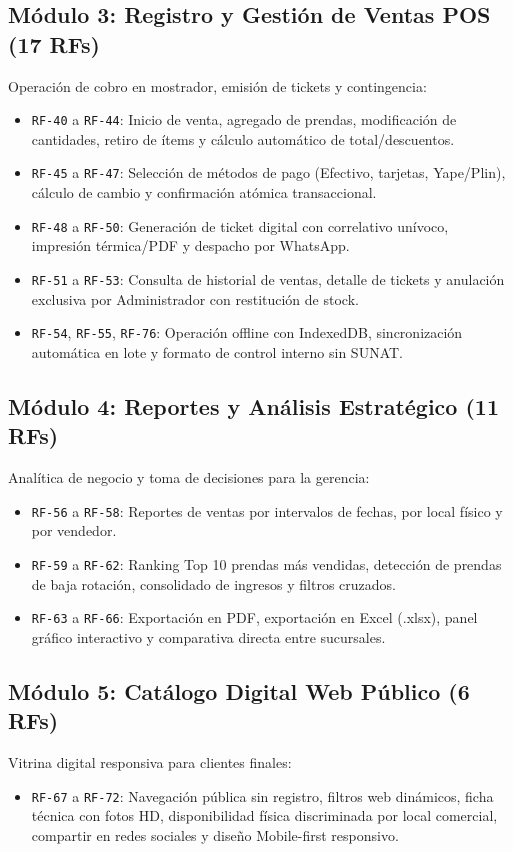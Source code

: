\subsection{Módulo 3: Registro y Gestión de Ventas POS (17 RFs)}
Operación de cobro en mostrador, emisión de tickets y contingencia:
\begin{itemize}
    \item \texttt{RF-40} a \texttt{RF-44}: Inicio de venta, agregado de prendas, modificación de cantidades, retiro de ítems y cálculo automático de total/descuentos.
    \item \texttt{RF-45} a \texttt{RF-47}: Selección de métodos de pago (Efectivo, tarjetas, Yape/Plin), cálculo de cambio y confirmación atómica transaccional.
    \item \texttt{RF-48} a \texttt{RF-50}: Generación de ticket digital con correlativo unívoco, impresión térmica/PDF y despacho por WhatsApp.
    \item \texttt{RF-51} a \texttt{RF-53}: Consulta de historial de ventas, detalle de tickets y anulación exclusiva por Administrador con restitución de stock.
    \item \texttt{RF-54}, \texttt{RF-55}, \texttt{RF-76}: Operación offline con IndexedDB, sincronización automática en lote y formato de control interno sin SUNAT.
\end{itemize}

\subsection{Módulo 4: Reportes y Análisis Estratégico (11 RFs)}
Analítica de negocio y toma de decisiones para la gerencia:
\begin{itemize}
    \item \texttt{RF-56} a \texttt{RF-58}: Reportes de ventas por intervalos de fechas, por local físico y por vendedor.
    \item \texttt{RF-59} a \texttt{RF-62}: Ranking Top 10 prendas más vendidas, detección de prendas de baja rotación, consolidado de ingresos y filtros cruzados.
    \item \texttt{RF-63} a \texttt{RF-66}: Exportación en PDF, exportación en Excel (.xlsx), panel gráfico interactivo y comparativa directa entre sucursales.
\end{itemize}

\subsection{Módulo 5: Catálogo Digital Web Público (6 RFs)}
Vitrina digital responsiva para clientes finales:
\begin{itemize}
    \item \texttt{RF-67} a \texttt{RF-72}: Navegación pública sin registro, filtros web dinámicos, ficha técnica con fotos HD, disponibilidad física discriminada por local comercial, compartir en redes sociales y diseño Mobile-first responsivo.
\end{itemize}


